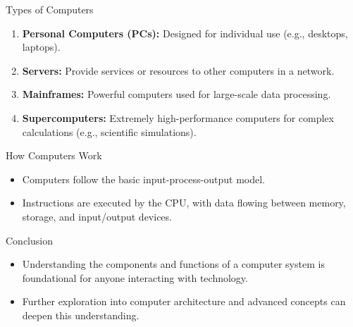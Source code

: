 \begin{frame}{Types of Computers}
  \begin{enumerate}
    \item \textbf{Personal Computers (PCs):} Designed for individual use (e.g., desktops, laptops).
    \item \textbf{Servers:} Provide services or resources to other computers in a network.
    \item \textbf{Mainframes:} Powerful computers used for large-scale data processing.
    \item \textbf{Supercomputers:} Extremely high-performance computers for complex calculations (e.g., scientific simulations).
  \end{enumerate}
\end{frame}

\begin{frame}{How Computers Work}
  \begin{itemize}
    \item Computers follow the basic input-process-output model.
    \item Instructions are executed by the CPU, with data flowing between memory, storage, and input/output devices.
  \end{itemize}
\end{frame}

\begin{frame}{Conclusion}
  \begin{itemize}
    \item Understanding the components and functions of a computer system is foundational for anyone interacting with technology.
    \item Further exploration into computer architecture and advanced concepts can deepen this understanding.
  \end{itemize}
\end{frame}
